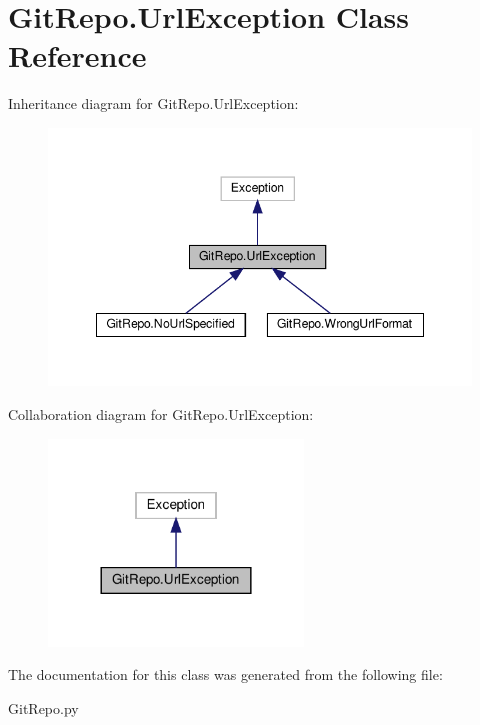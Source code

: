 \hypertarget{class_git_repo_1_1_url_exception}{}\section{Git\+Repo.\+Url\+Exception Class Reference}
\label{class_git_repo_1_1_url_exception}


Inheritance diagram for Git\+Repo.\+Url\+Exception\+:\nopagebreak
\begin{figure}[H]
\begin{center}
\leavevmode
\includegraphics[width=348pt]{class_git_repo_1_1_url_exception__inherit__graph}
\end{center}
\end{figure}


Collaboration diagram for Git\+Repo.\+Url\+Exception\+:\nopagebreak
\begin{figure}[H]
\begin{center}
\leavevmode
\includegraphics[width=192pt]{class_git_repo_1_1_url_exception__coll__graph}
\end{center}
\end{figure}


The documentation for this class was generated from the following file\+:\begin{DoxyCompactItemize}
\item 
Git\+Repo.\+py\end{DoxyCompactItemize}
